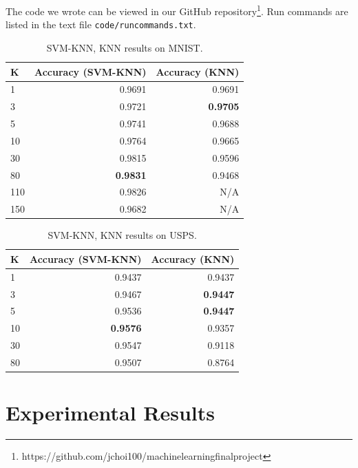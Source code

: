 \documentclass[11pt,letterpaper]{article}
\begin{document}

The code we wrote can be viewed in our GitHub repository\footnote{https://github.com/jchoi100/machine\textunderscore learning\textunderscore final\textunderscore project}. Run commands are listed in the text file {\tt code/run\textunderscore commands.txt}.

\begin{table}
\begin{center}
\begin{tabular}{|l|r|r|}
\hline \bf K & \bf Accuracy (SVM-KNN) & \bf Accuracy (KNN)\\ \hline
1 & 0.9691 & 0.9691 \\
3 & 0.9721 & \textbf{0.9705} \\
5 & 0.9741 & 0.9688 \\
10 & 0.9764 & 0.9665 \\
30 & 0.9815 & 0.9596 \\
80 & \textbf{0.9831} & 0.9468 \\
110 & 0.9826& N/A \\
150 & 0.9682 & N/A \\
\hline
\end{tabular}
\end{center}
\caption{\label{svm-knn-mnist} SVM-KNN, KNN results on MNIST. }
\end{table}

\begin{table}
\begin{center}
\begin{tabular}{|l|r|r|}
\hline \bf K & \bf Accuracy (SVM-KNN) & \bf Accuracy (KNN)\\ \hline
1 & 0.9437 & 0.9437\\
3 & 0.9467 & \textbf{0.9447}\\
5 & 0.9536 & \textbf{0.9447}\\
10 & \textbf{0.9576} & 0.9357\\
30 & 0.9547 & 0.9118\\
80 & 0.9507 & 0.8764\\
\hline
\end{tabular}
\end{center}
\caption{\label{knn-mnist} SVM-KNN, KNN results on USPS. }
\end{table}

\section{Experimental Results}
\end{document}
